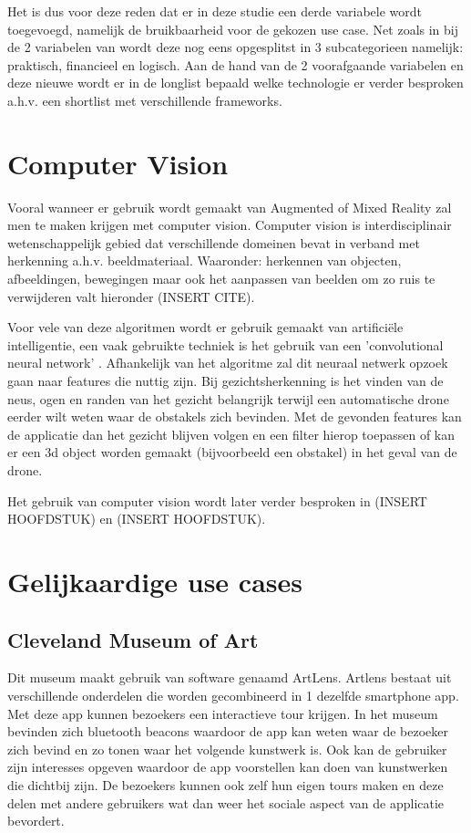 Het is dus voor deze reden dat er in deze studie een derde variabele wordt toegevoegd, namelijk de bruikbaarheid voor de gekozen use case. Net zoals in bij de 2 variabelen van \textcite{Steuer1992} wordt deze nog eens opgesplitst in 3 subcategorieen namelijk: praktisch, financieel en logisch. Aan de hand van de 2 voorafgaande variabelen en deze nieuwe wordt er in de longlist bepaald welke technologie er verder besproken a.h.v. een shortlist met verschillende frameworks. 

\section{Computer Vision}

Vooral wanneer er gebruik wordt gemaakt van Augmented of Mixed Reality zal men te maken krijgen met computer vision. Computer vision is interdisciplinair wetenschappelijk gebied dat verschillende domeinen bevat in verband met herkenning a.h.v. beeldmateriaal. Waaronder: herkennen van objecten, afbeeldingen, bewegingen maar ook het aanpassen van beelden om zo ruis te verwijderen valt hieronder (INSERT CITE).

Voor vele van deze algoritmen wordt er gebruik gemaakt van artificiële intelligentie, een vaak gebruikte techniek is het gebruik van een 'convolutional neural network' \autocite{Ji2010}. Afhankelijk van het algoritme zal dit neuraal netwerk opzoek gaan naar features die nuttig zijn. Bij gezichtsherkenning is het vinden van de neus, ogen en randen van het gezicht belangrijk terwijl een automatische drone eerder wilt weten waar de obstakels zich bevinden. Met de gevonden features kan de applicatie dan het gezicht blijven volgen en een filter hierop toepassen of kan er een 3d object worden gemaakt (bijvoorbeeld een obstakel) in het geval van de drone. 

Het gebruik van computer vision wordt later verder besproken in (INSERT HOOFDSTUK) en (INSERT HOOFDSTUK). %

\section{Gelijkaardige use cases}
\subsection{Cleveland Museum of Art}
Dit museum maakt gebruik van software genaamd ArtLens. Artlens bestaat uit verschillende onderdelen die worden gecombineerd in 1 dezelfde smartphone app. Met deze app kunnen bezoekers een interactieve tour krijgen. In het museum bevinden zich bluetooth beacons waardoor de app kan weten waar de bezoeker zich bevind en zo tonen waar het volgende kunstwerk is. Ook kan de gebruiker zijn interesses opgeven waardoor de app voorstellen kan doen van kunstwerken die dichtbij zijn. 
De bezoekers kunnen ook zelf hun eigen tours maken en deze delen met andere gebruikers wat dan weer het sociale aspect van de applicatie bevordert.

